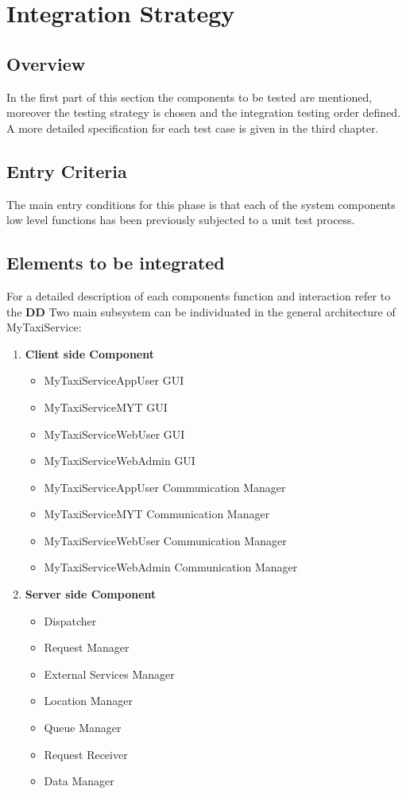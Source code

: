 \documentclass[11pt,titlepage]{article} %
\begin{document}
\section{Integration Strategy}

\subsection{Overview}
  In the first part of this section the components to be tested are mentioned,
  moreover the testing strategy is chosen and the integration testing order defined.\newline
  A more detailed specification for each test case is given in the third chapter.

\subsection{Entry Criteria}
  The main entry conditions for this phase is that each of the system components low level functions
  has been previously subjected to a unit test process. 

\subsection{Elements to be integrated}
  For a detailed description of each components function and interaction refer to the \textbf{DD} \newline
  Two main subsystem can be individuated in the general architecture of MyTaxiService:
  \begin{enumerate}
    \item \textbf{Client side Component}
	  \begin{itemize}
	    \item MyTaxiServiceAppUser GUI
	    \item MyTaxiServiceMYT GUI
	    \item MyTaxiServiceWebUser GUI
	    \item MyTaxiServiceWebAdmin GUI
	    
	    \item MyTaxiServiceAppUser Communication Manager
	    \item MyTaxiServiceMYT Communication Manager
	    \item MyTaxiServiceWebUser Communication Manager
	    \item MyTaxiServiceWebAdmin Communication Manager
	  \end{itemize}
    
    \item \textbf{Server side Component}
	  \begin{itemize}
	    \item Dispatcher
	    \item Request Manager
	    \item External Services Manager
	    \item Location Manager
	    \item Queue Manager
	    \item Request Receiver
	    \item Data Manager
	  \end{itemize}
  \end{enumerate}
\end{document}
